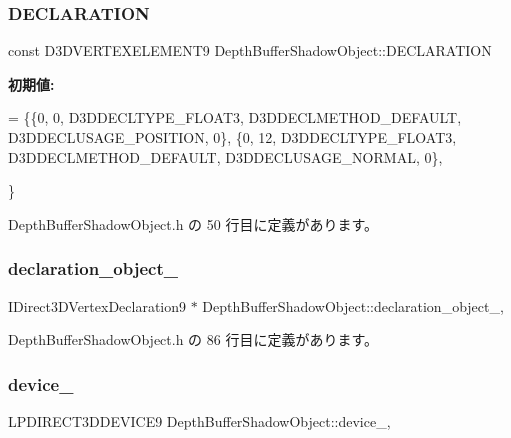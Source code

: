\subsubsection{\texorpdfstring{D\+E\+C\+L\+A\+R\+A\+T\+I\+ON}{DECLARATION}}
{\footnotesize\ttfamily const D3\+D\+V\+E\+R\+T\+E\+X\+E\+L\+E\+M\+E\+N\+T9 Depth\+Buffer\+Shadow\+Object\+::\+D\+E\+C\+L\+A\+R\+A\+T\+I\+ON\hspace{0.3cm}{\ttfamily [static]}}

{\bfseries 初期値\+:}
\begin{DoxyCode}
= \{\{0,  0, D3DDECLTYPE\_FLOAT3, D3DDECLMETHOD\_DEFAULT, D3DDECLUSAGE\_POSITION, 0\},
       \{0, 12, D3DDECLTYPE\_FLOAT3, D3DDECLMETHOD\_DEFAULT, D3DDECLUSAGE\_NORMAL,   0\},

      \}
\end{DoxyCode}


 Depth\+Buffer\+Shadow\+Object.\+h の 50 行目に定義があります。

\mbox{\label{class_depth_buffer_shadow_object_a20f1043c9809e9eaf06632b6dae4dafe}} 
\subsubsection{\texorpdfstring{declaration\+\_\+object\+\_\+}{declaration\_object\_}}
{\footnotesize\ttfamily I\+Direct3\+D\+Vertex\+Declaration9 $\ast$ Depth\+Buffer\+Shadow\+Object\+::declaration\+\_\+object\+\_\+\hspace{0.3cm}{\ttfamily [static]}, {\ttfamily [private]}}



 Depth\+Buffer\+Shadow\+Object.\+h の 86 行目に定義があります。

\mbox{\label{class_depth_buffer_shadow_object_a2e91bbbf8298fdb977f762fb871ff199}} 
\subsubsection{\texorpdfstring{device\+\_\+}{device\_}}
{\footnotesize\ttfamily L\+P\+D\+I\+R\+E\+C\+T3\+D\+D\+E\+V\+I\+C\+E9 Depth\+Buffer\+Shadow\+Object\+::device\+\_\+\hspace{0.3cm}{\ttfamily [static]}, {\ttfamily [private]}}



